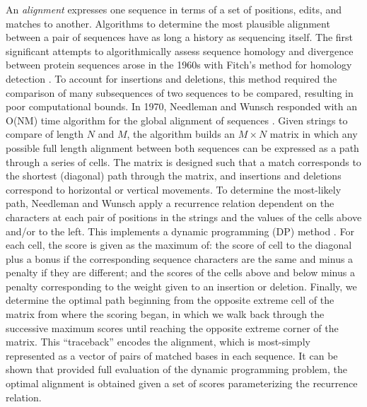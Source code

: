 An \emph{alignment} expresses one sequence in terms of a set of positions, edits, and matches to another.
Algorithms to determine the most plausible alignment between a pair of sequences have as long a history as sequencing itself.
The first significant attempts to algorithmically assess sequence homology and divergence between protein sequences arose in the 1960s with Fitch's method for homology detection \cite{fitch1966improved}.
To account for insertions and deletions, this method required the comparison of many subsequences of two sequences to be compared, resulting in poor computational bounds.
In 1970, Needleman and Wunsch responded with an O(NM) time algorithm for the global alignment of sequences \cite{needleman1970general}.
Given strings to compare of length $N$ and $M$, the algorithm builds an $M \times N$ matrix in which any possible full length alignment between both sequences can be expressed as a path through a series of cells.
The matrix is designed such that a match corresponds to the shortest (diagonal) path through the matrix, and insertions and deletions correspond to horizontal or vertical movements.
To determine the most-likely path, Needleman and Wunsch apply a recurrence relation dependent on the characters at each pair of positions in the strings and the values of the cells above and/or to the left.
This implements a dynamic programming (DP) method \cite{bellman1952theory}.
For each cell, the score is given as the maximum of: the score of cell to the diagonal plus a bonus if the corresponding sequence characters are the same and minus a penalty if they are different; and the scores of the cells above and below minus a penalty corresponding to the weight given to an insertion or deletion.
Finally, we determine the optimal path beginning from the opposite extreme cell of the matrix from where the scoring began, in which we walk back through the successive maximum scores until reaching the opposite extreme corner of the matrix.
This ``traceback'' encodes the alignment, which is most-simply represented as a vector of pairs of matched bases in each sequence.
It can be shown that provided full evaluation of the dynamic programming problem, the optimal alignment is obtained given a set of scores parameterizing the recurrence relation.

